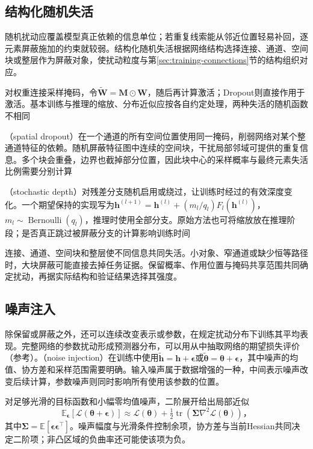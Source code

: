 \subsection{结构化随机失活}
\label{sec:generalization-structured-dropout}

随机扰动应覆盖模型真正依赖的信息单位；若重复线索能从邻近位置轻易补回，逐元素屏蔽施加的约束就较弱。结构化随机失活根据网络结构选择连接、通道、空间块或整层作为屏蔽对象，使扰动粒度与第\ref{sec:training-connections}节的结构组织对应。

对权重连接采样掩码，令$\tilde{\bm W}=\bm M\odot\bm W$，随后再计算激活；Dropout则直接作用于激活。基本训练与推理的缩放、分布近似应按各自约定处理，两种失活的随机函数不相同

（spatial dropout）在一个通道的所有空间位置使用同一掩码，削弱网络对某个整通道特征的依赖。随机屏蔽特征图中连续的空间块，干扰局部邻域可提供的重复信息。多个块会重叠，边界也截掉部分位置，因此块中心的采样概率与最终元素失活比例需要分别计算

（stochastic depth）对残差分支随机启用或绕过，让训练时经过的有效深度变化。一个期望保持的实现写为$\bm h^{(l+1)}=\bm h^{(l)}+(m_l/q_l)F_l(\bm h^{(l)})$，$m_l\sim\operatorname{Bernoulli}(q_l)$，推理时使用全部分支。原始方法也可将缩放放在推理阶段；是否真正跳过被屏蔽分支的计算影响训练时间

连接、通道、空间块和整层使不同信息共同失活。小对象、窄通道或缺少恒等路径时，大块屏蔽可能直接去掉任务证据。保留概率、作用位置与掩码共享范围共同确定扰动，再据实际结构和验证结果选择其强度。

\subsection{噪声注入}
\label{sec:generalization-noise}

除保留或屏蔽之外，还可以连续改变表示或参数，在规定扰动分布下训练其平均表现。完整网络的参数扰动形成预测器分布，可以用从中抽取网络的期望损失评价（参考）。（noise injection）在训练中使用$\tilde{\bm h}=\bm h+\bm\epsilon$或$\tilde{\bm\theta}=\bm\theta+\bm\epsilon$，其中噪声的均值、协方差和采样范围需要明确。输入噪声属于数据增强的一种，中间表示噪声改变后续计算，参数噪声则同时影响所有使用该参数的位置。

对足够光滑的目标函数和小幅零均值噪声，二阶展开给出局部近似
\begin{equation}
  \mathbb E_{\bm\epsilon}[\mathcal L(\bm\theta+\bm\epsilon)]
  \approx\mathcal L(\bm\theta)+\tfrac12
      \operatorname{tr}(\bm\Sigma\nabla^2\mathcal L(\bm\theta))\text{，}
  \label{eq:generalization-noise-expansion}
\end{equation}
其中$\bm\Sigma=\mathbb E[\bm\epsilon\bm\epsilon^{\top}]$。噪声幅度与光滑条件控制余项，协方差与当前Hessian共同决定二阶项；非凸区域的负曲率还可能使该项为负。

